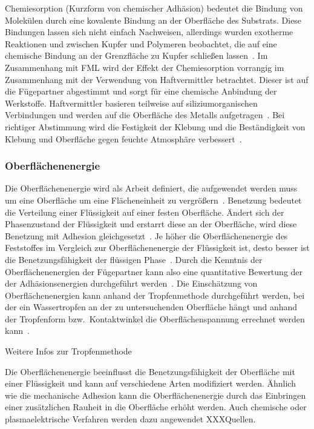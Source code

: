 Chemiesorption (Kurzform von chemischer Adhäsion) bedeutet die Bindung von Molekülen durch eine kovalente Bindung an der Oberfläche des Substrats.
Diese Bindungen lassen sich nicht einfach Nachweisen, allerdings wurden exotherme Reaktionen und zwischen Kupfer und Polymeren beobachtet, die auf eine chemische Bindung an der Grenzfläche zu Kupfer schließen lassen~\cite{Schroeer1994}.
Im Zusammenhang mit FML wird der Effekt der Chemiesorption vorrangig im Zusammenhang mit der Verwendung von Haftvermittler betrachtet.
Dieser ist auf die Fügepartner abgestimmt und sorgt für eine chemische Anbindung der Werkstoffe.
Haftvermittler basieren teilweise auf siliziumorganischen Verbindungen und werden auf die Oberfläche des Metalls aufgetragen~\cite{Zucchi2006}.
Bei richtiger Abstimmung wird die Festigkeit der Klebung und die Beständigkeit von Klebung und Oberfläche gegen feuchte Atmosphäre verbessert~\cite{Habenicht2009}.

\subsubsection{Oberflächenenergie}\label{subsubsec:eoberfläche}

Die Oberflächenenergie wird als Arbeit definiert, die aufgewendet werden muss um eine Oberfläche um eine Flächeneinheit zu vergrößern~\cite{Flock2012}.
Benetzung bedeutet die Verteilung einer Flüssigkeit auf einer festen Oberfläche.
Ändert sich der Phasenzustand der Flüssigkeit und erstarrt diese an der Oberfläche, wird diese Benetzung mit Adhesion gleichgesetzt~\cite{Habenicht2009}.
Je höher die Oberflächenenergie des Feststoffes im Vergleich zur Oberflächenenergie der Flüssigkeit ist, desto besser ist die Benetzungsfähigkeit der flüssigen Phase~\cite{Flock2012}.
Durch die Kenntnis der Oberflächenenergien der Fügepartner kann also eine quantitative Bewertung der der Adhäsionsenergien durchgeführt werden~\cite{Nikolova2005}.
Die Einschätzung von Oberflächenenergien kann anhand der Tropfenmethode durchgeführt werden, bei der ein Wassertropfen an der zu untersuchenden Oberfläche hängt und anhand der Tropfenform bzw.\ Kontaktwinkel die Oberflächenspannung errechnet werden kann~\cite{Flock2012}.

Weitere Infos zur Tropfenmethode

Die Oberflächenenergie beeinflusst die Benetzungsfähigkeit der Oberfläche mit einer Flüssigkeit und kann auf verschiedene Arten modifiziert werden.
Ähnlich wie die mechanische Adhesion kann die Oberflächenenergie durch das Einbringen einer zusätzlichen Rauheit in die Oberfläche erhöht werden.
Auch chemische oder plasmaelektrische Verfahren werden dazu angewendet XXXQuellen.

